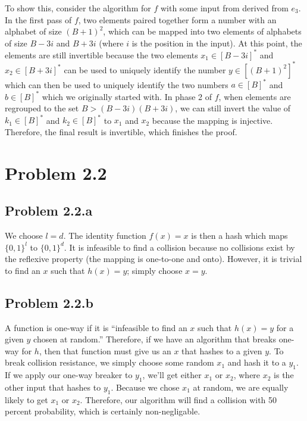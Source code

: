 \documentclass[psamsfonts]{amsart}
\begin{document}
To show this, consider the algorithm for $f$ with some input from derived from $e_3$. In the first pass of $f$, two elements paired together form a number with an alphabet of size $(B+1)^2$, which can be mapped into two elements of alphabets of size $B-3i$ and $B+3i$ (where $i$ is the position in the input). At this point, the elements are still invertible because the two elements $x_1 \in [B-3i]^*$ and $x_2 \in [B+3i]^*$ can be used to uniquely identify the number $y \in [(B+1)^2]^*$ which can then be used to uniquely identify the two numbers $a \in [B]^*$ and $b \in [B]^*$ which we originally started with. In phase 2 of $f$, when elements are regrouped to the set $B > (B - 3i) (B + 3i)$, we can still invert the value of $k_1 \in [B]^*$ and $k_2 \in [B]^*$ to $x_1$ and $x_2$ because the mapping is injective. Therefore, the final result is invertible, which finishes the proof.

\section*{Problem 2.2}

\subsection*{Problem 2.2.a}

We choose $l = d$. The identity function $f(x) = x$ is then a hash which maps $\{0, 1\}^l$ to $\{0, 1\}^d$. It is infeasible to find a collision because no collisions exist by the reflexive property (the mapping is one-to-one and onto). However, it is trivial to find an $x$ such that $h(x) = y$; simply choose $x = y$.

\subsection*{Problem 2.2.b}

 A function is one-way if it is ``infeasible to find an $x$ such that $h(x) = y$ for a given $y$ chosen at random.'' Therefore, if we have an algorithm that breaks one-way for $h$, then that function must give us an $x$ that hashes to a given $y$. To break collision resistance, we simply choose some random $x_1$ and hash it to a $y_1$. If we apply our one-way breaker to $y_1$, we'll get either $x_1$ or $x_2$, where $x_2$ is the other input that hashes to $y_1$. Because we chose $x_1$ at random, we are equally likely to get $x_1$ or $x_2$. Therefore, our algorithm will find a collision with 50 percent probability, which is certainly non-negligable.
\end{document}
